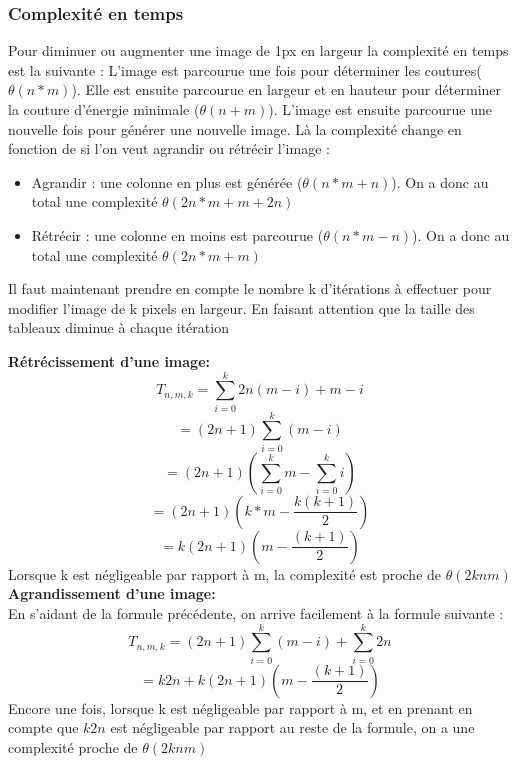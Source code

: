 \documentclass[10pt]{article}
\begin{document}
\subsubsection{Complexité en temps}
	Pour diminuer ou augmenter une image de 1px en largeur la complexité en temps est la suivante :
L'image est parcourue une fois pour déterminer les coutures($\theta(n*m)$). Elle est ensuite parcourue en largeur et en hauteur pour déterminer la couture d'énergie minimale ($\theta(n+m)$). L'image est ensuite parcourue une nouvelle fois pour générer une nouvelle image. Là la complexité change en fonction de si l'on veut agrandir ou rétrécir l'image :
\begin{itemize}
 \item Agrandir : une colonne en plus est générée ($\theta(n*m + n)$). On a donc au total une complexité $\theta(2n*m + m + 2n)$
 \item Rétrécir : une colonne en moins est parcourue ($\theta(n*m - n)$). On a donc au total une complexité $\theta(2n*m + m)$
 \end{itemize}
 Il faut maintenant prendre en compte le nombre k d'itérations à effectuer pour modifier l'image de k pixels en largeur. En faisant attention que la taille des tableaux diminue à chaque itération
 
\textbf{Rétrécissement d'une image:}
$$
 	T_{n,m,k} = \sum\limits_{i=0}^{k} 2n(m-i) + m-i 
$$
$$
 	= (2n + 1)\sum\limits_{i=0}^{k} (m -i)
$$
$$
 	= (2n + 1)(\sum\limits_{i=0}^{k} m - \sum\limits_{i=0}^{k} i)
$$
$$
 	= (2n + 1)(k*m - \frac{k(k+1)}{2})
$$
$$
 	= k(2n + 1)(m - \frac{(k+1)}{2})
$$
Lorsque k est négligeable par rapport à m, la complexité est proche de $\theta(2knm)$\\
\textbf{Agrandissement d'une image:} \\
En s'aidant de la formule précédente, on arrive facilement à la formule suivante :
$$
 	T_{n,m,k} = (2n + 1)\sum\limits_{i=0}^{k} (m -i) + \sum\limits_{i=0}^{k} 2n
$$
$$
 	= k2n + k(2n + 1)(m - \frac{(k+1)}{2})
$$
Encore une fois, lorsque k est négligeable par rapport à m, et en prenant en compte que $k2n$ est négligeable par rapport au reste de la formule, on a une complexité proche de $\theta(2knm)$ 
 
\end{document}
